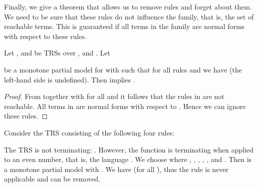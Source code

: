 Finally, we give a theorem that allows us to remove rules and forget about them.
We need to be sure that these rules do not influence the family, that is, the set of reachable terms.
This is guaranteed if all terms in the family are normal forms with 
respect to these rules.

\begin{theorem}\label{thm:qremove}
  Let ,  and 
  be TRSs over , and .
  Let 
  
  be a monotone partial model for  with 
  such that for all rules  and 
  we have  (the left-hand side is undefined).
  Then  implies .
\end{theorem}
\begin{proof}
  From 
  together with  for all 
  and  it follows that the rules in  are not reachable. All terms in  are normal
  forms with respect to . Hence we can ignore these rules.
\end{proof}

\begin{example}{
  \newcommand{\ssuc}{\msf{s}}
  \newcommand{\suc}{\funap{\msf{s}}}
  \newcommand{\zer}{0}
  Consider the TRS  consisting of the following four rules:

The TRS is not terminating: . However, the function  is terminating when applied to an even number,
  that is, the language .
  We choose 
  where , , ,
  , ,  and .
  Then  is a monotone partial model with .
  We have  (for all ), thus the rule
   is never applicable and can be removed.
}\end{example}
